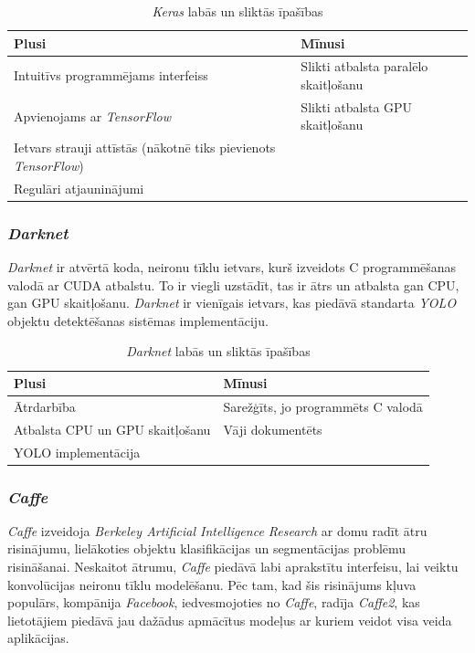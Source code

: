 	\begin{table}[ht!]	
		\centering
		\begin{tabular}{ |p{7cm}|p{7cm}| }
			\hline
			\textbf{Plusi} & \textbf{Mīnusi}\\ \hline
			Intuitīvs programmējams interfeiss & Slikti atbalsta paralēlo skaitļošanu \\ \hline 
			Apvienojams ar \textit{TensorFlow} & Slikti atbalsta GPU skaitļošanu \\ \hline
			Ietvars strauji attīstās (nākotnē tiks pievienots \textit{TensorFlow})  &  \\  \hline
			Regulāri atjauninājumi & \\ \hline
		\end{tabular}
		\caption{\textit{Keras} labās un sliktās īpašības}
	\end{table}


\subsubsection{\textit{Darknet}}

\textit{Darknet} ir atvērtā koda, neironu tīklu ietvars, kurš izveidots C programmēšanas valodā ar CUDA atbalstu. To ir viegli uzstādīt, tas ir ātrs un atbalsta gan CPU, gan GPU skaitļošanu. \textit{Darknet} ir vienīgais ietvars, kas piedāvā standarta \textit{YOLO} objektu detektēšanas sistēmas implementāciju. 

	\begin{table}[ht!]
		\centering	
		\begin{tabular}{ |p{7cm}|p{7cm}| }
			\hline
			\textbf{Plusi} & \textbf{Mīnusi}\\ \hline
			Ātrdarbība & Sarežģīts, jo programmēts C valodā \\ \hline 
			Atbalsta CPU un GPU skaitļošanu & Vāji dokumentēts \\ \hline
			YOLO implementācija  &  \\  \hline
		\end{tabular}
		\caption{\textit{Darknet} labās un sliktās īpašības}
	\end{table}


\subsubsection{\textit{Caffe}}

\textit{Caffe} izveidoja \textit{Berkeley Artificial Intelligence Research} ar domu radīt ātru risinājumu, lielākoties objektu klasifikācijas un segmentācijas problēmu risināšanai. Neskaitot ātrumu, \textit{Caffe} piedāvā labi aprakstītu interfeisu, lai veiktu konvolūcijas neironu tīklu modelēšanu. Pēc tam, kad šis risinājums kļuva populārs, kompānija \textit{Facebook}, iedvesmojoties no \textit{Caffe}, radīja \textit{Caffe2}, kas lietotājiem piedāvā jau dažādus apmācītus modeļus ar kuriem veidot visa veida aplikācijas. 

